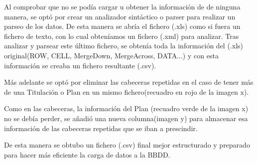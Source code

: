 Al comprobar que no se podía cargar u obtener la información de de ninguna manera, se optó por crear un analizador sintáctico o parser para realizar un parseo de los datos. De esta manera se abría el fichero (.xls) como si fuera un fichero de texto, con lo cual obteníamos un fichero (.xml) para analizar. Tras analizar y parsear este último fichero, se obtenía toda la información del (.xls) original(ROW, CELL, MergeDown, MergeAcross, DATA...) y con esta información se creaba un fichero resultante (.csv). 

Más adelante se optó por eliminar las cabeceras repetidas en el caso de tener más de una Titulación o Plan en un mismo fichero(recuadro en rojo de la imagen x).


Como en las cabeceras, la información del Plan (recuadro verde de la imagen x) no se debía perder, se añadió una nueva columna(imagen y) para almacenar esa información de las cabeceras repetidas que se iban a prescindir.




De esta manera se obtubo un fichero (.csv) final mejor estructurado y preparado para hacer más eficiente la carga de datos a la BBDD.


  


